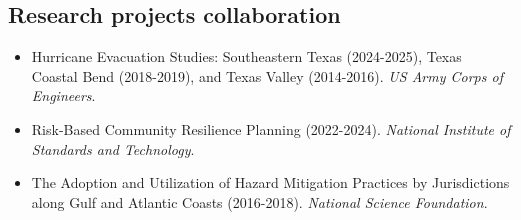 \documentclass[11pt]{article}
\begin{document}
\subsection*{Research projects collaboration}
\begin{itemize}[leftmargin=20pt]
\item Hurricane Evacuation Studies: Southeastern Texas (2024-2025), Texas Coastal Bend (2018-2019), and Texas Valley (2014-2016). \emph{US Army Corps of Engineers}.
\item Risk-Based Community Resilience Planning (2022-2024). \emph{National Institute of Standards and Technology}.
\item The Adoption and Utilization of Hazard Mitigation Practices by Jurisdictions along Gulf and Atlantic Coasts (2016-2018). \emph{National Science Foundation}.
\end{itemize}
\end{document}

